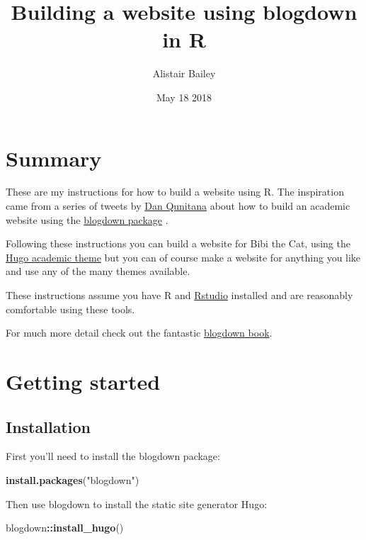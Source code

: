 \documentclass[12pt,]{book}
\title{Building a website using blogdown in R}
\author{Alistair Bailey}
\date{May 18 2018}
\newenvironment{Shaded}{\begin{snugshade}}{\end{snugshade}}
\newcommand{\KeywordTok}[1]{\textcolor[rgb]{0.13,0.29,0.53}{\textbf{#1}}}
\newcommand{\StringTok}[1]{\textcolor[rgb]{0.31,0.60,0.02}{#1}}
\newcommand{\OperatorTok}[1]{\textcolor[rgb]{0.81,0.36,0.00}{\textbf{#1}}}
\newcommand{\NormalTok}[1]{#1}
\theoremstyle{definition}
\theoremstyle{definition}
\theoremstyle{definition}
\theoremstyle{remark}
\begin{document}
\maketitle

{
\setcounter{tocdepth}{1}
\tableofcontents
}
\listoftables
\listoffigures
\chapter*{Summary}\label{summary}

These are my instructions for how to build a website using R. The
inspiration came from a series of tweets by
\href{https://twitter.com/dsquintana}{Dan Qunitana} about how to build
an academic website using the
\href{https://bookdown.org/yihui/blogdown/}{blogdown package}
\citep{R-bookdown}.

Following these instructions you can build a website for Bibi the Cat,
using the \href{https://themes.gohugo.io/academic/}{Hugo academic theme}
but you can of course make a website for anything you like and use any
of the many themes available.

These instructions assume you have R \citep{R-base} and
\href{https://www.rstudio.com/}{Rstudio} installed and are reasonably
comfortable using these tools.

For much more detail check out the fantastic
\href{https://bookdown.org/yihui/blogdown/}{blogdown book}.

\chapter{Getting started}\label{getting-started}

\section{Installation}\label{installation}

First you'll need to install the blogdown package:

\begin{Shaded}
\begin{Highlighting}[]
\KeywordTok{install.packages}\NormalTok{(}\StringTok{"blogdown"}\NormalTok{)}
\end{Highlighting}
\end{Shaded}

Then use blogdown to install the static site generator Hugo:

\begin{Shaded}
\begin{Highlighting}[]
\NormalTok{blogdown}\OperatorTok{::}\KeywordTok{install_hugo}\NormalTok{()}
\end{Highlighting}
\end{Shaded}
\end{document}
